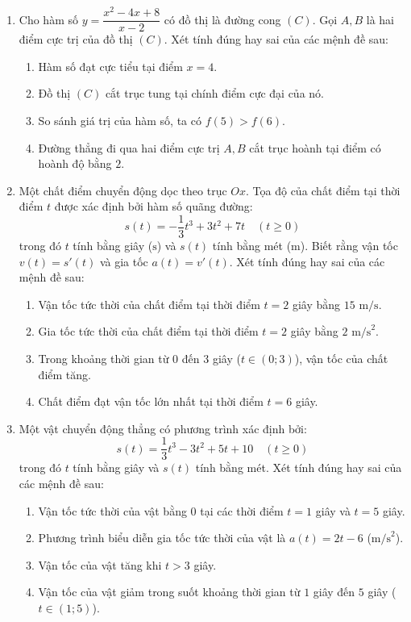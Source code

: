 \documentclass[12pt]{article}
\begin{document}
\begin{enumerate}[label=\textbf{Câu \arabic*.}]
		\item Cho hàm số $y = \dfrac{x^2 - 4x + 8}{x - 2}$ có đồ thị là đường cong $(C)$. Gọi $A, B$ là hai điểm cực trị của đồ thị $(C)$. Xét tính đúng hay sai của các mệnh đề sau:
		\begin{enumerate}[label=\alph*)]
			\item Hàm số đạt cực tiểu tại điểm $x = 4$.
			\item Đồ thị $(C)$ cắt trục tung tại chính điểm cực đại của nó.
			\item So sánh giá trị của hàm số, ta có $f(5) > f(6)$.
			\item Đường thẳng đi qua hai điểm cực trị $A, B$ cắt trục hoành tại điểm có hoành độ bằng $2$.
		\end{enumerate}
		
		\item Một chất điểm chuyển động dọc theo trục $Ox$. Tọa độ của chất điểm tại thời điểm $t$ được xác định bởi hàm số quãng đường:
		$$s(t) = -\dfrac{1}{3}t^3 + 3t^2 + 7t \quad (t \ge 0)$$
		trong đó $t$ tính bằng giây ($\text{s}$) và $s(t)$ tính bằng mét ($\text{m}$). Biết rằng vận tốc $v(t) = s'(t)$ và gia tốc $a(t) = v'(t)$. Xét tính đúng hay sai của các mệnh đề sau:
		\begin{enumerate}[label=\alph*)]
			\item Vận tốc tức thời của chất điểm tại thời điểm $t = 2$ giây bằng $15$ $\text{m/s}$.
			\item Gia tốc tức thời của chất điểm tại thời điểm $t = 2$ giây bằng $2$ $\text{m/s}^2$.
			\item Trong khoảng thời gian từ $0$ đến $3$ giây ($t \in (0; 3)$), vận tốc của chất điểm tăng.
			\item Chất điểm đạt vận tốc lớn nhất tại thời điểm $t = 6$ giây.
		\end{enumerate}
		
		\item Một vật chuyển động thẳng có phương trình xác định bởi:
		$$s(t) = \dfrac{1}{3}t^3 - 3t^2 + 5t + 10 \quad (t \ge 0)$$
		trong đó $t$ tính bằng giây và $s(t)$ tính bằng mét. Xét tính đúng hay sai của các mệnh đề sau:
		\begin{enumerate}[label=\alph*)]
			\item Vận tốc tức thời của vật bằng $0$ tại các thời điểm $t = 1$ giây và $t = 5$ giây.
			\item Phương trình biểu diễn gia tốc tức thời của vật là $a(t) = 2t - 6$ ($\text{m/s}^2$).
			\item Vận tốc của vật tăng khi $t > 3$ giây.
			\item Vận tốc của vật giảm trong suốt khoảng thời gian từ $1$ giây đến $5$ giây ($t \in (1; 5)$).
		\end{enumerate}
		

\end{enumerate}
\end{document}
